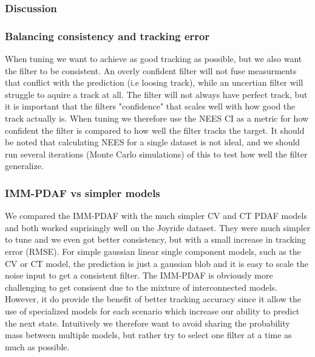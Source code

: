 \subsubsection{Discussion}
\subsubsection{Balancing consistency and tracking error}
When tuning we want to achieve as good tracking as possible, but we also want the filter to be consistent. An overly confident filter will not fuse measurments that conflict with the prediction (i.e loosing track), while an uncertian filter will struggle to aquire a track at all. The filter will not always have perfect track, but it is important that the filters "confidence" that scales well with how good the track actually is.
When tuning we therefore use the NEES CI as a metric for how confident the filter is compared to how well the filter tracks the target. It should be noted that calculating NEES for a single dataset is not ideal, and we should run several iterations (Monte Carlo simulations) of this to test how well the filter generalize.   

\subsubsection{IMM-PDAF vs simpler models} \label{whyimmpdaf}
We compared the IMM-PDAF with the much simpler CV and CT PDAF models and both worked suprisingly well on the Joyride dataset. They were much simpler to tune and we even got better consistency, but with a small increase in tracking error (RMSE). For simple gaussian linear single component models, such as the CV or CT model, the prediction is just a gaussian blob and it is easy to scale the noise input to get a consistent filter. The IMM-PDAF is obviously more challenging to get consisent due to the mixture of interconnected models. However, it do provide the benefit of better tracking accuracy since it allow the use of specialized models for each scenario which increase our ability to predict the next state. Intuitively we therefore want to avoid sharing the probability mass between multiple models, but rather try to select one filter at a time as much as possible.